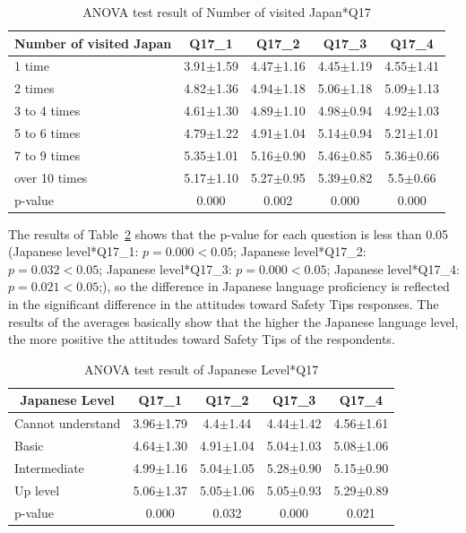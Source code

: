 \begin{table}[h]
  \caption{ANOVA test result of Number of visited Japan*Q17}
  \label{table32c}
  \centering
  \begin{tabular}{l|cccc}
 \hline
        \multicolumn{1}{c|}{Number of visited Japan}          & Q17\_1               & Q17\_2 & Q17\_3    & Q17\_4       \\
\hline
1 time        & 3.91$\pm$1.59 & 4.47$\pm$1.16   & 4.45$\pm$1.19   & 4.55$\pm$1.41 \\
2 times       & 4.82$\pm$1.36 & 4.94$\pm$1.18  & 5.06$\pm$1.18   & 5.09$\pm$1.13 \\
3 to 4 times  & 4.61$\pm$1.30 & 4.89$\pm$1.10 & 4.98$\pm$0.94 & 4.92$\pm$1.03  \\
5 to 6 times  & 4.79$\pm$1.22 & 4.91$\pm$1.04 & 5.14$\pm$0.94 & 5.21$\pm$1.01 \\
7 to 9 times  & 5.35$\pm$1.01 & 5.16$\pm$0.90 & 5.46$\pm$0.85 & 5.36$\pm$0.66 \\
over 10 times & 5.17$\pm$1.10& 5.27$\pm$0.95 & 5.39$\pm$0.82 & 5.5$\pm$0.66 \\           
\hline
p-value&           0.000&         0.002&         0.000&   0.000   \\
 \hline
  \end{tabular}
\end{table}


The results of Table~\ref{table32d} shows that the p-value for each question is less than 0.05 (Japanese level*Q17\_1: $p=0.000<0.05$; Japanese level*Q17\_2: $p=0.032<0.05$; Japanese level*Q17\_3: $p=0.000<0.05$; Japanese level*Q17\_4: $p=0.021<0.05$;), so the difference in Japanese language proficiency is reflected in the significant difference in the attitudes toward Safety Tips responses. The results of the averages basically show that the higher the Japanese language level, the more positive the attitudes toward Safety Tips of the respondents. 



\begin{table}[h]
  \caption{ANOVA test result of Japanese Level*Q17}
  \label{table32d}
  \centering
  \begin{tabular}{l|cccc}
 \hline
        \multicolumn{1}{c|}{Japanese Level}          & Q17\_1               & Q17\_2 & Q17\_3    & Q17\_4        \\
\hline
Cannot understand & 3.96$\pm$1.79& 4.4$\pm$1.44 & 4.44$\pm$1.42 & 4.56$\pm$1.61 \\
Basic             & 4.64$\pm$1.30 & 4.91$\pm$1.04 & 5.04$\pm$1.03  & 5.08$\pm$1.06  \\
Intermediate      & 4.99$\pm$1.16 & 5.04$\pm$1.05 & 5.28$\pm$0.90 & 5.15$\pm$0.90  \\
Up level          & 5.06$\pm$1.37& 5.05$\pm$1.06 & 5.05$\pm$0.93 & 5.29$\pm$0.89 \\        
\hline
p-value&           0.000&         0.032&         0.000&   0.021   \\
 \hline
  \end{tabular}
\end{table}



